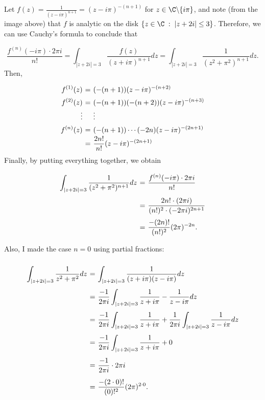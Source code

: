 Let $\displaystyle f(z) = \frac{1}{(z-i\pi)^{n+1}} = (z-i\pi)^{-(n+1)}$ for $z \in \C\backslash\{i\pi\}$, and note (from the image above) that $f$ is analytic on the disk $\{z\in\C \;:\; |z+2i| \leq 3\}$. Therefore, we can use Cauchy's formula to conclude that

\[ \frac{f^{(n)}(-i\pi) \cdot 2\pi i}{n!} = \int_{|z+2i| = 3} \frac{f(z)}{(z+i\pi)^{n+1}} dz = \int_{|z+2i| = 3} \frac{1}{(z^2+\pi^2)^{n+1}}dz. \]
Then,
\[ \everymath{\displaystyle}
\arraycolsep=1.8pt\def\arraystretch{1.5}
\begin{array}{rcl}
    f^{(1)}(z) & = & (-(n+1))(z-i\pi)^{-(n+2)}\\
    f^{(2)}(z) & = & (-(n+1))(-(n+2))(z-i\pi)^{-(n+3)}\\
    \vdots & & \vdots\\
    f^{(n)}(z) & = & (-(n+1))\cdots (-2n)(z-i\pi)^{-(2n+1)}\\
    & = & \frac{2n!}{n!}(z-i\pi)^{-(2n+1)}
\end{array} \]
Finally, by putting everything together, we obtain
\[ \everymath{\displaystyle}
\arraycolsep=1.8pt\def\arraystretch{2.5}
\begin{array}{rcl}
    \int_{|z+2i| = 3} \frac{1}{(z^2+\pi^2)^{n+1}}dz & = & \frac{f^{(n)}(-i\pi) \cdot 2\pi i}{n!}\\
    & = & \frac{2n!\cdot (2\pi i)}{(n!)^2\cdot(-2\pi i)^{2n+1}}\\
    & = & \frac{-(2n)!}{(n!)^2}(2\pi)^{-2n} .
\end{array} \]

Also, I made the case $n = 0$ using partial fractions:


\[ \everymath{\displaystyle}
\arraycolsep=1.8pt\def\arraystretch{2.5}
\begin{array}{rcl}
    \int_{|z+2i| = 3} \frac{1}{z^2+\pi^2}dz & = & \int_{|z+2i| = 3} \frac{1}{(z+i\pi)(z-i\pi)}dz\\
    & = & \frac{-1}{2\pi i}\int_{|z+2i| = 3} \frac{1}{z+i\pi} - \frac{1}{z-i\pi}dz\\
    & = & \frac{-1}{2\pi i}\int_{|z+2i| = 3} \frac{1}{z+i\pi} + \frac{1}{2\pi i}\int_{|z+2i| = 3} \frac{1}{z-i\pi}dz\\
    & = & \frac{-1}{2\pi i}\int_{|z+2i| = 3} \frac{1}{z+i\pi} + 0\\
    & = &  \frac{-1}{2\pi i} \cdot 2\pi i\\
    & = & \frac{-(2\cdot 0)!}{(0)!^2} (2\pi)^{2\cdot 0}.
\end{array}  \]


